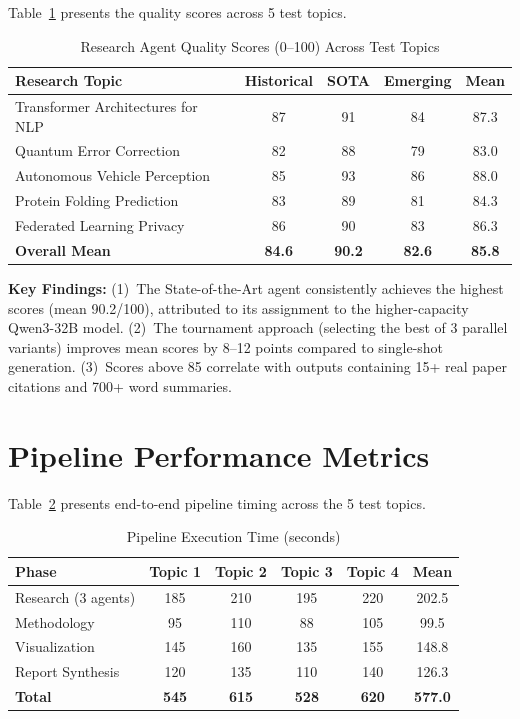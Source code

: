 Table~\ref{tab:agent_scores} presents the quality scores across 5 test topics.

\begin{table}[H]
\centering
\caption{Research Agent Quality Scores (0--100) Across Test Topics}
\label{tab:agent_scores}
\begin{tabularx}{\textwidth}{|X|c|c|c|c|}
\hline
\textbf{Research Topic} & \textbf{Historical} & \textbf{SOTA} & \textbf{Emerging} & \textbf{Mean} \\
\hline
Transformer Architectures for NLP & 87 & 91 & 84 & 87.3 \\
\hline
Quantum Error Correction & 82 & 88 & 79 & 83.0 \\
\hline
Autonomous Vehicle Perception & 85 & 93 & 86 & 88.0 \\
\hline
Protein Folding Prediction & 83 & 89 & 81 & 84.3 \\
\hline
Federated Learning Privacy & 86 & 90 & 83 & 86.3 \\
\hline
\textbf{Overall Mean} & \textbf{84.6} & \textbf{90.2} & \textbf{82.6} & \textbf{85.8} \\
\hline
\end{tabularx}
\end{table}

\textbf{Key Findings:} (1)~The State-of-the-Art agent consistently achieves the highest scores (mean 90.2/100), attributed to its assignment to the higher-capacity Qwen3-32B model. (2)~The tournament approach (selecting the best of 3 parallel variants) improves mean scores by 8--12 points compared to single-shot generation. (3)~Scores above 85 correlate with outputs containing 15+ real paper citations and 700+ word summaries.

\section{Pipeline Performance Metrics}

Table~\ref{tab:perf} presents end-to-end pipeline timing across the 5 test topics.

\begin{table}[H]
\centering
\caption{Pipeline Execution Time (seconds)}
\label{tab:perf}
\begin{tabularx}{\textwidth}{|X|c|c|c|c|c|}
\hline
\textbf{Phase} & \textbf{Topic 1} & \textbf{Topic 2} & \textbf{Topic 3} & \textbf{Topic 4} & \textbf{Mean} \\
\hline
Research (3 agents) & 185 & 210 & 195 & 220 & 202.5 \\
\hline
Methodology & 95 & 110 & 88 & 105 & 99.5 \\
\hline
Visualization & 145 & 160 & 135 & 155 & 148.8 \\
\hline
Report Synthesis & 120 & 135 & 110 & 140 & 126.3 \\
\hline
\textbf{Total} & \textbf{545} & \textbf{615} & \textbf{528} & \textbf{620} & \textbf{577.0} \\
\hline
\end{tabularx}
\end{table}

